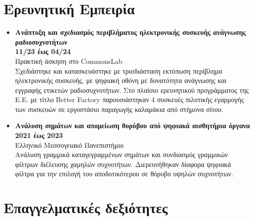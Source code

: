 \documentclass[a4paper,9pt]{extarticle}
\begin{document}
\section*{Ερευνητική Εμπειρία}
\begin{itemize}
\item{\textbf{Ανάπτυξη και σχεδιασμός περιβλήματος ηλεκτρονικής συσκευής ανάγνωσης ραδιοσυχνοτήτων}} \\
        \textbf{11/23 έως 04/24} \\
        Πρακτική άσκηση στο CommonsLab \\
        Σχεδιάστηκε και κατασκευάστηκε με τρισδιάσταση εκτύπωση περίβλημα
        ηλεκτρονικής συσκευής, με ψηφιακή οθόνη με δυνατότητα ανάγνωσης και
        εγγραφής ετικετών ραδιοσυχνοτήτων. Στο πλαίσιο ερευνητικού προγράμματος
        της Ε.Ε. με τίτλο Better Factory
        παρουσιάστηκαν 4 συσκευές πιλοτικής εγαρμογής των συσκευών σε εργοστάσιο
        παραγωγής καλαμάκια από στήμονα σίτου. \\
\item{\textbf{Ανάλυση σημάτων και απομείωση θορύβου από ψηφιακά αισθητήρια όργανα}}\\
        \textbf{2021 έως 2023} \\
        Ελληνικό Μεσσογειακό Πανεπιστήμιο \\
        Ανάλυση γραμμικά καταγεγραμμένων σημάτων και συνδιασμός γραμμικών
        φίλτρων διέλευσης χαμηλών συχνοτήτων. Διερευνήθηκαν δίαφορα ψηφιακά φίλτρα
        για την επιλογή του αποδοτικότερου σε θόρυβο υψηλών συχνοτήτων. \\
\end{itemize}


\section*{Επαγγελματικές δεξιότητες}
\end{document}
